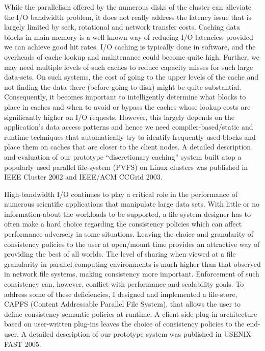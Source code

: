 \documentclass[11pt]{article}
\begin{document}
While the parallelism 
offered by the numerous disks of the cluster can alleviate the I/O bandwidth 
problem, it does not really address the latency issue that is largely limited 
by seek, rotational and network transfer costs. Caching data blocks in main 
memory is a well-known way of reducing I/O latencies, provided we can achieve 
good hit rates. I/O caching is typically done in software, and the overheads 
of cache lookup and maintenance could become quite high. Further, we may need 
multiple levels of such caches to reduce capacity misses for such large 
data-sets. On such systems, the cost of going to the upper levels of the cache 
and not finding the data there (before going to disk) might be quite 
substantial. Consequently, it becomes important to intelligently determine what
blocks to place in caches and when to avoid or bypass the caches whose lookup 
costs are significantly higher on I/O requests. However, this largely depends 
on the application's data access patterns and hence we need compiler-based/static 
and runtime techniques that automatically try to identify frequently 
used blocks and place them on caches that are closer to the client nodes.
A detailed description and evaluation of our prototype ``discretionary caching'' system
built atop a popularly used parallel file-system (PVFS) on Linux clusters
was published in IEEE Cluster 2002 and IEEE/ACM CCGrid 2003.

High-bandwidth I/O continues to play a critical role
in the performance of numerous scientific applications that manipulate
large data sets.
With little or no information about the
workloads to be supported, a file system designer has to often make
a hard choice regarding the consistency policies which can affect performance
adversely in some situations.
Leaving the choice and granularity 
of consistency policies to the user at open/mount time provides an
attractive way of providing the best of all worlds. The level of sharing when 
viewed at a file granularity in parallel computing
environments is much higher than that observed in network file 
systems, making consistency more important.
Enforcement of such consistency can, however, conflict with performance
and scalability goals. To address some of these deficiencies, I designed and
implemented a file-store, CAPFS (Content
Addressable Parallel File System), that
allows the user to define consistency semantic policies at runtime.
A client-side plug-in architecture based on user-written plug-ins 
leaves the choice of consistency policies to the end-user. A detailed description
of our prototype system was published in USENIX FAST 2005.
\end{document}
